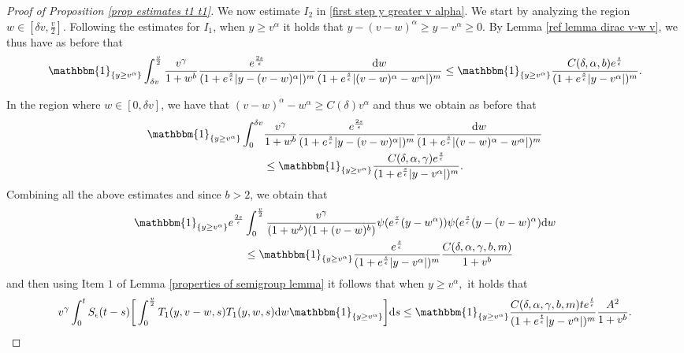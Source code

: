 \documentclass[11pt]{article}
\numberwithin{equation}{section}
\newcommand{\der}{\textup{d}}
\begin{document}
\begin{proof}[Proof of Proposition 
\ref{prop estimates t1 t1}]
We now estimate $I_{2}$ in \eqref{first step y greater v alpha}. We start by analyzing the region $w\in[\delta v, \frac{v}{2}]$. Following the estimates for $I_{1}$, when $y\geq v^{\alpha}$ it holds that $y-(v-w)^{\alpha}\geq y-v^{\alpha}\geq 0$. By Lemma \ref{ref lemma dirac v-w v}, we thus have as before that
\begin{align*}
\mathbbm{1}_{\{y\geq v^{\alpha}\}}\int_{\delta v}^{\frac{v}{2}}\frac{v^{\gamma}}{1+w^{b}}\frac{e^{\frac{2s}{\epsilon}}}{(1+e^{\frac{s}{\epsilon}}|y-(v-w)^{\alpha}|)^{m}}\frac{\der w}{(1+e^{\frac{s}{\epsilon}}|(v-w)^{\alpha}-w^{\alpha}|)^{m}}\leq   \mathbbm{1}_{\{y\geq v^{\alpha}\}} \frac{C(\delta,\alpha,b)e^{\frac{s}{\epsilon}}}{(1+e^{\frac{s}{\epsilon}}|y-v^{\alpha}|)^{m}}  .
\end{align*}


In the region where $w\in[0,\delta v]$, we have that $(v-w)^{\alpha}-w^{\alpha}\geq C(\delta)v^{\alpha}$ and thus we obtain as before that 
  \begin{align*}
  \mathbbm{1}_{\{y\geq v^{\alpha}\}}  \int_{0}^{\delta v} & \frac{v^{\gamma}}{1+w^{b}}\frac{e^{\frac{2s}{\epsilon}}}{(1+e^{\frac{s}{\epsilon}}|y-(v-w)^{\alpha}|)^{m}}\frac{\der w}{(1+e^{\frac{s}{\epsilon}}|(v-w)^{\alpha}-w^{\alpha}|)^{m}}\\
       &\leq   \mathbbm{1}_{\{y\geq v^{\alpha}\}} \frac{C(\delta,\alpha,\gamma)e^{\frac{s}{\epsilon}}}{(1+e^{\frac{s}{\epsilon}}|y-v^{\alpha}|)^{m}}  .
\end{align*}
Combining all the above estimates and since $b>2$, we obtain that
\begin{align*}
   \mathbbm{1}_{\{y\geq v^{\alpha}\}} e^{\frac{2s}{\epsilon}}&\int_{0}^{\frac{v}{2}}\frac{v^{\gamma}}{(1+w^{b})(1+(v-w)^{b})}\psi(e^{\frac{s}{\epsilon}}(y-w^{\alpha}))\psi(e^{\frac{s}{\epsilon}}(y-(v-w)^{\alpha})\der w\\
    &\leq  \mathbbm{1}_{\{y\geq v^{\alpha}\}} \frac{e^{\frac{s}{\epsilon}}}{(1+e^{\frac{s}{\epsilon}}|y-v^{\alpha}|)^{m}}    \frac{C(\delta,\alpha,\gamma,b,m)}{1+v^{b}}
\end{align*}
and then using Item $1$ of Lemma 
\ref{properties of semigroup lemma} it follows that when $y\geq v^{\alpha},$ it holds that
\begin{align*}
   v^{\gamma}\int_{0}^{t}S_{\epsilon}(t-s)\bigg[\int_{0}^{\frac{v}{2}} T_{1}(y,v-w,s)T_{1}(y,w,s)\der w\mathbbm{1}_{\{y\geq v^{\alpha}\}}\bigg]\der s\leq  \mathbbm{1}_{\{y\geq v^{\alpha}\}}\frac{C(\delta,\alpha,\gamma,b,m)t e^{\frac{t}{\epsilon}}}{(1+e^{\frac{t}{\epsilon}}|y-v^{\alpha}|)^{m}}    \frac{A^{2}}{1+v^{b}}.

\end{align*}
\end{proof}
\end{document}
